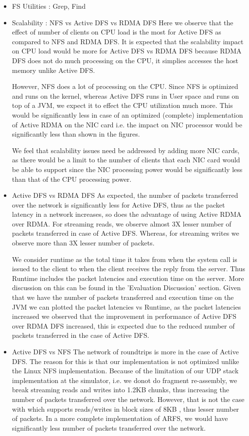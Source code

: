 \documentclass[10pt]{article}
\begin{document}
\begin{itemize}
\item FS Utilities : Grep, Find

\item Scalability : NFS vs Active DFS vs RDMA DFS
Here we observe that the effect of number of clients on CPU load is the most for Active DFS as compared to NFS and RDMA DFS. It is expected that the scalability impact on CPU load would be more for Active DFS vs RDMA DFS because RDMA DFS does not do much processing on the CPU, it simplies accesses the host memory unlike Active DFS. 

However, NFS does a lot of processing on the CPU. Since NFS is optimized and runs on the kernel, whereas Active DFS runs in User space and runs on top of a JVM, we expect it to effect the CPU utilization much more. This would be significantly less in case of an optimized (complete) implementation of Active RDMA on the NIC card i.e. the impact on NIC processor would be significantly less than shown in the figures. 

We feel that scalability issues need be addressed by adding more NIC cards, as there would be a limit to the number of clients that each NIC card would be able to support since the NIC processing power would be significantly less than that of the CPU processing power.
\item Active DFS vs RDMA DFS
As expected, the number of packets transferred over the network is significantly less for Active DFS, thus as the packet latency in a network increases, so does the advantage of using Active RDMA over RDMA. For streaming reads, we observe almost 3X lesser number of packets transferred in case of Active DFS. Whereas, for streaming writes we observe more than 3X lesser number of packets.

We consider runtime as the total time it takes from when the system call is issued to the client to when the client receives the reply from the server. Thus Runtime includes the packet latencies and execution time on the server. More discussion on this can be found in the 'Evaluation Discussion' section. Given that we have the number of packets transferred and execution time on the JVM we can plotted the packet latencies vs Runtime, as the packet latencies increased we observed that the improvement in performance of Active DFS over RDMA DFS increased, this is expected due to the reduced number of packets transferred in the case of Active DFS.
\item Active DFS vs NFS
The network of roundtrips is more in the case of Active DFS. The reason for this is that our implementation is not optimized unlike the Linux NFS implementation. Because of the limitation of our UDP stack implementation at the simulator, i.e. we donot do fragment re-assembly, we break streaming reads and writes into 1.2KB chunks, thus increasing the number of packets transferred over the network. However, that is not the case with which supports reads/writes in block sizes of 8KB , thus lesser number of packets. In a more complete implementation of ARFS, we would have significantly less number of packets transferred over the network.
\end{itemize}
\end{document}
